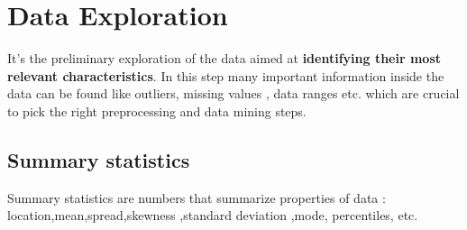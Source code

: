 \newpage
\section{Data Exploration}
It's the preliminary exploration of the data aimed at \textbf{identifying their most relevant characteristics}. In this step many important information inside the data can be found like outliers, missing values , data ranges etc. which are crucial to pick the right preprocessing  and data mining steps.\\
\subsection{Summary statistics}
Summary statistics are numbers that summarize properties of data : location,mean,spread,skewness ,standard deviation ,mode, percentiles, etc.
